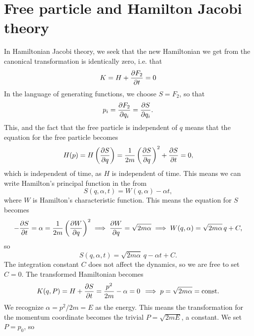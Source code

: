 \documentclass{article}
\begin{document}
    \section{Free particle and Hamilton Jacobi theory}
        In Hamiltonian Jacobi theory, we seek that the new Hamiltonian we get from the canonical transformation is identically zero, i.e. that
        \begin{equation*}
            K = H + \pdv{F_2}{t} = 0
        \end{equation*} 
        In the language of generating functions, we choose $S = F_2$, so that
        \begin{equation*}
            p_i = \pdv{F_2}{q_i} = \pdv{S}{q_i}. 
        \end{equation*}
        This, and the fact that the free particle is independent of $q$ means that the equation for the free particle becomes
        \begin{equation*}
            H(p) = H\left(\pdv{S}{q}\right) = \frac{1}{2m} \left(\pdv{S}{q}\right)^2 + \pdv{S}{t} = 0,
        \end{equation*}
        which is independent of time, as $H$ is independent of time. This means we can write Hamilton's principal function in the from
        \begin{equation*}
            S(q, \alpha, t) = W(q, \alpha) - \alpha t,
        \end{equation*}
        where $W$ is Hamilton's characteristic function. This means the equation for $S$ becomes
        \begin{equation*}
            -\pdv{S}{t} = \alpha = \frac{1}{2m} \left(\pdv{W}{q}\right)^2 \implies \pdv{W}{q} = \sqrt{2 m \alpha} \implies W(q, \alpha) = \sqrt{2m\alpha} \, q + C,
        \end{equation*}
        so
        \begin{equation*}
            S(q, \alpha, t) = \sqrt{2m\alpha} \, q - \alpha t + C.
        \end{equation*}
        The integration constant $C$ does not affect the dynamics, so we are free to set $C=0$. The transformed Hamiltonian becomes
        \begin{equation*}
            K(q, P) = H + \pdv{S}{t} = \frac{p^2}{2m} - \alpha = 0 \, \implies p = \sqrt{2m\alpha} = \mathrm{const.}
        \end{equation*}
        We recognize $\alpha = p^2 /2m = E$ as the energy. This means the transformation for the momentum coordinate becomes the trivial $P = \sqrt{2mE}$, a constant. We set $P = p_0$, so
\end{document}
